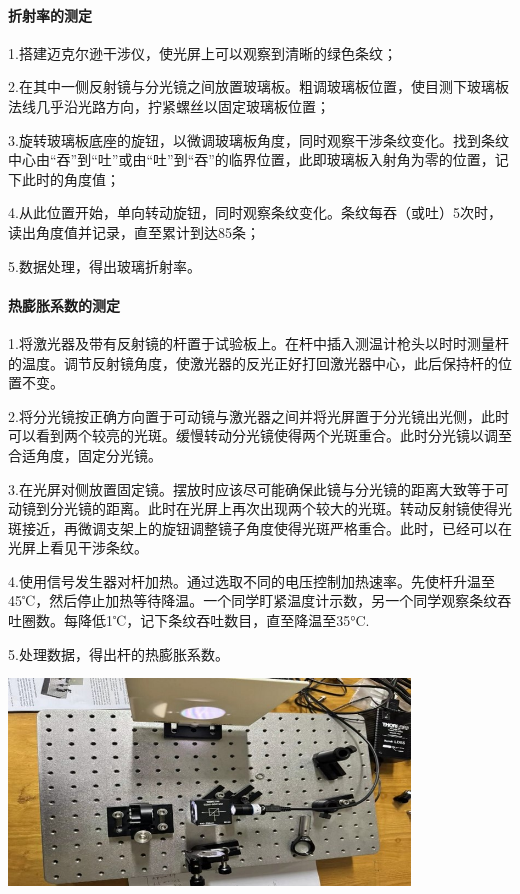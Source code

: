 \documentclass[10pt]{ctexart}
\begin{document}
\paragraph{折射率的测定}\mbox{}

1.搭建迈克尔逊干涉仪，使光屏上可以观察到清晰的绿色条纹；

2.在其中一侧反射镜与分光镜之间放置玻璃板。粗调玻璃板位置，使目测下玻璃板法线几乎沿光路方向，拧紧螺丝以固定玻璃板位置；

3.旋转玻璃板底座的旋钮，以微调玻璃板角度，同时观察干涉条纹变化。找到条纹中心由“吞”到“吐”或由“吐”到“吞”的临界位置，此即玻璃板入射角为零的位置，记下此时的角度值；

4.从此位置开始，单向转动旋钮，同时观察条纹变化。条纹每吞（或吐）5次时，读出角度值并记录，直至累计到达85条；

5.数据处理，得出玻璃折射率。
\paragraph{热膨胀系数的测定}\mbox{}

1.将激光器及带有反射镜的杆置于试验板上。在杆中插入测温计枪头以时时测量杆的温度。调节反射镜角度，使激光器的反光正好打回激光器中心，此后保持杆的位置不变。

2.将分光镜按正确方向置于可动镜与激光器之间并将光屏置于分光镜出光侧，此时可以看到两个较亮的光斑。缓慢转动分光镜使得两个光斑重合。此时分光镜以调至合适角度，固定分光镜。

3.在光屏对侧放置固定镜。摆放时应该尽可能确保此镜与分光镜的距离大致等于可动镜到分光镜的距离。此时在光屏上再次出现两个较大的光斑。转动反射镜使得光斑接近，再微调支架上的旋钮调整镜子角度使得光斑严格重合。此时，已经可以在光屏上看见干涉条纹。

4.使用信号发生器对杆加热。通过选取不同的电压控制加热速率。先使杆升温至45℃，然后停止加热等待降温。一个同学盯紧温度计示数，另一个同学观察条纹吞吐圈数。每降低1℃，记下条纹吞吐数目，直至降温至35°C.

5.处理数据，得出杆的热膨胀系数。

\vspace{10pt}

\begin{minipage}{\textwidth} 
        \includegraphics[width=0.8\textwidth]{图片1.jpg}
\end{minipage}
\end{document}

